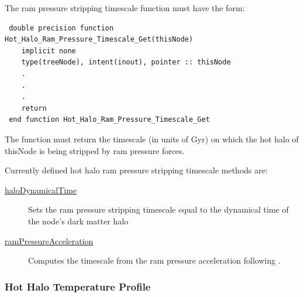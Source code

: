 The ram pressure stripping timescale function must have the form:
\begin{verbatim}
 double precision function Hot_Halo_Ram_Pressure_Timescale_Get(thisNode)
    implicit none
    type(treeNode), intent(inout), pointer :: thisNode
    .
    .
    .
    return
 end function Hot_Halo_Ram_Pressure_Timescale_Get
\end{verbatim}
The function must return the timescale (in units of Gyr) on which the hot halo of {\normalfont \ttfamily thisNode} is being stripped by ram pressure forces.

Currently defined hot halo ram pressure stripping timescale methods are:
\begin{description}
 \item [\hyperlink{hot_halo.ram_pressure_stripping.timescale.halo_dynamical_time.F90:hot_halo_ram_pressure_timescales_halo_dyntime:hot_halo_ram_pressure_timescale_halo_dyntime}{{\normalfont \ttfamily haloDynamicalTime}}] Sets the ram pressure stripping timescale equal to the dynamical time of the node's dark matter halo
 \item [\hyperlink{hot_halo.ram_pressure_stripping.timescale.ram_pressure_acceleration.F90:hot_halo_ram_pressure_timescales_ram_pressure_accel:hot_halo_ram_pressure_timescale_ram_pressure_accel}{{\normalfont \ttfamily ramPressureAcceleration}}] Computes the timescale from the ram pressure acceleration following \cite{roediger_ram_2007}.
\end{description}

\subsubsection{Hot Halo Temperature Profile}

